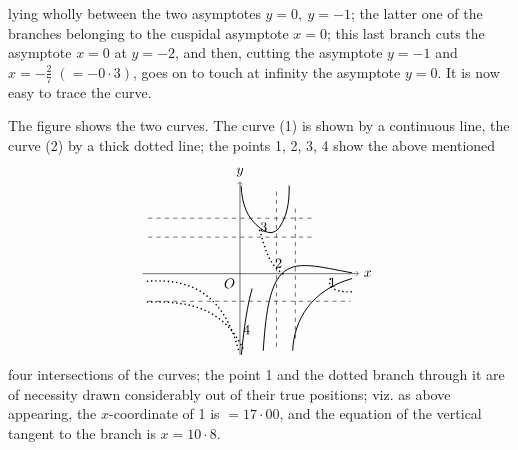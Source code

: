 \documentclass[10pt,twoside]{article}
\begin{document}
\setcounter{page}{586}

lying wholly between the two asymptotes \(y=0,\ y=-1\); the latter one of the
branches belonging to the cuspidal asymptote \(x=0\); this last branch cuts the
asymptote \(x=0\) at \(y=-2\), and then, cutting the asymptote \(y=-1\) and
\(x=-\frac{2}{7}\;(=-0\cdot 3)\), goes on to touch at infinity the asymptote
\(y=0\). It is now easy to trace the curve.

The figure shows the two curves. The curve (1) is shown by a continuous line,
the curve (2) by a thick dotted line; the points 1, 2, 3, 4 show the above
mentioned
\[
\begin{tikzpicture}[x=0.68cm,y=0.68cm,baseline=(current bounding box.center)]
  \draw[->] (-3.6,0) -- (4.4,0) node[right] {\(x\)};
  \draw[->] (0,-3.0) -- (0,3.4) node[above] {\(y\)};
  \node[below left] at (0,0) {\(O\)};
  \draw[dashed] (1.35,-2.7) -- (1.35,3.2);
  \draw[dashed] (2.05,-2.4) -- (2.05,2.4);
  \draw[dashed] (-3.4,1.35) -- (2.8,1.35);
  \draw[dashed] (-3.4,-1.02) -- (4.1,-1.02);
  \draw[dashed] (-3.4,2.05) -- (2.8,2.05);
  \draw[line width=0.7pt]
    (0.04,3.25) .. controls (0.08,2.55) and (0.26,2.05) .. (0.75,1.68)
    .. controls (1.05,1.44) and (1.28,1.48) .. (1.45,1.70)
    .. controls (1.85,2.25) and (1.82,3.0) .. (1.82,3.25);
  \draw[line width=0.7pt]
    (0.86,-2.85) .. controls (0.94,-1.7) and (1.05,-0.5) .. (1.55,0.0)
    .. controls (2.05,0.52) and (2.95,0.25) .. (4.15,0.03);
  \draw[line width=0.7pt]
    (1.95,-2.85) .. controls (2.0,-1.7) and (2.65,-0.6) .. (4.15,-0.18);
  \draw[line width=0.7pt]
    (0.05,-3.0) .. controls (0.16,-1.9) and (0.28,-1.15) .. (0.45,-0.55);
  \draw[line width=1.0pt,dotted]
    (-3.45,-0.28) .. controls (-2.05,-0.18) and (-0.65,-0.55) .. (-0.05,-2.85);
  \draw[line width=1.0pt,dotted]
    (-3.45,-1.05) .. controls (-1.9,-1.0) and (-0.6,-1.25) .. (0.15,-2.85);
  \draw[line width=1.0pt,dotted]
    (0.72,1.62) .. controls (0.95,0.95) and (1.02,0.35) .. (1.62,-0.02);
  \draw[line width=1.0pt,dotted]
    (3.35,-0.18) .. controls (3.18,-0.58) and (3.7,-0.72) .. (4.25,-0.66);
  \node at (3.42,-0.33) {1};
  \node at (1.43,0.38) {2};
  \node at (0.88,1.72) {3};
  \node at (0.25,-2.08) {4};
\end{tikzpicture}
\]
four intersections of the curves; the point 1 and the dotted branch through it
are of necessity drawn considerably out of their true positions; viz. as above
appearing, the \(x\)-coordinate of 1 is \(=17\cdot 00\), and the equation of the
vertical tangent to the branch is \(x=10\cdot 8\).
\end{document}
